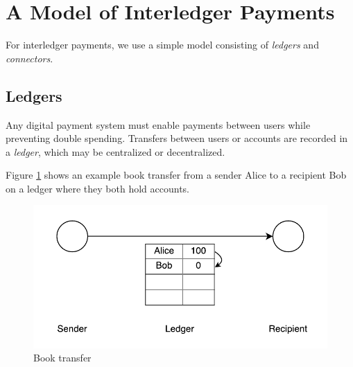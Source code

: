 \documentclass[letterpaper,twocolumn,10pt]{article}
\begin{document}




\section{A Model of Interledger Payments}

For interledger payments, we use a simple model consisting of \textit{ledgers} and \textit{connectors}.
                 
\subsection{Ledgers}



Any digital payment system must enable payments between users while preventing double spending. Transfers between users or accounts are recorded in a \textit{ledger}, which may be centralized or decentralized. \cite{Bitcoin}

Figure \ref{fig:three-bells} shows an example book transfer from a sender Alice to a recipient Bob on a ledger where they both hold accounts.

\begin{figure}[ht]
    \centering
    \includegraphics[width=\columnwidth]{figures/three-bells.pdf}
    \caption{Book transfer}
    \label{fig:three-bells}
\end{figure}
\end{document}
